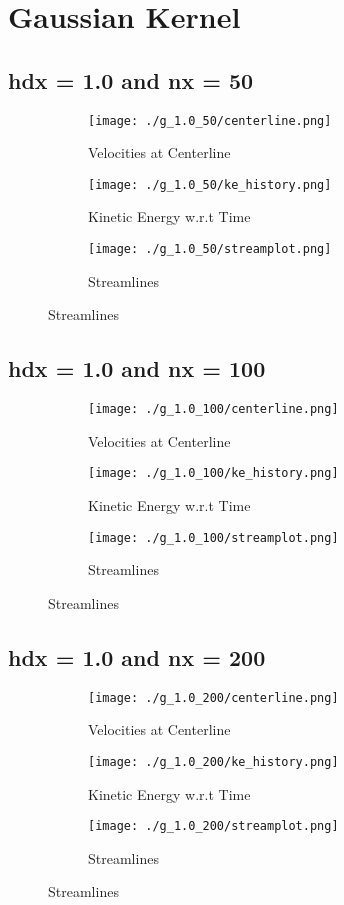 \documentclass[12pt, a4paper]{report}
\begin{document}
\section{Gaussian Kernel}
\subsection{hdx = 1.0 and nx = 50}
\begin{figure}[H]
\begin{subfigure}{0.5\textwidth}
	\texttt{[image: ./g\_1.0\_50/centerline.png]}
	\caption{Velocities at Centerline}
\end{subfigure}
\begin{subfigure}{0.5\textwidth}
	\texttt{[image: ./g\_1.0\_50/ke\_history.png]}
	\caption{Kinetic Energy w.r.t Time}
\end{subfigure}
\medskip
\begin{subfigure}{\textwidth}
	\centering
	\texttt{[image: ./g\_1.0\_50/streamplot.png]}
	\caption{Streamlines}
\end{subfigure}
\end{figure}

\subsection{hdx = 1.0 and nx = 100}
\begin{figure}[H]
\begin{subfigure}{0.5\textwidth}
	\texttt{[image: ./g\_1.0\_100/centerline.png]}
	\caption{Velocities at Centerline}
\end{subfigure}
\begin{subfigure}{0.5\textwidth}
	\texttt{[image: ./g\_1.0\_100/ke\_history.png]}
	\caption{Kinetic Energy w.r.t Time}
\end{subfigure}
\medskip
\begin{subfigure}{\textwidth}
	\texttt{[image: ./g\_1.0\_100/streamplot.png]}
	\caption{Streamlines}
\end{subfigure}
\end{figure}

\subsection{hdx = 1.0 and nx = 200}
\begin{figure}[H]
\begin{subfigure}{0.5\textwidth}
	\texttt{[image: ./g\_1.0\_200/centerline.png]}
	\caption{Velocities at Centerline}
\end{subfigure}
\begin{subfigure}{0.5\textwidth}
	\texttt{[image: ./g\_1.0\_200/ke\_history.png]}
	\caption{Kinetic Energy w.r.t Time}
\end{subfigure}
\medskip
\begin{subfigure}{\textwidth}
	\texttt{[image: ./g\_1.0\_200/streamplot.png]}
	\caption{Streamlines}
\end{subfigure}
\end{figure}
\end{document}

